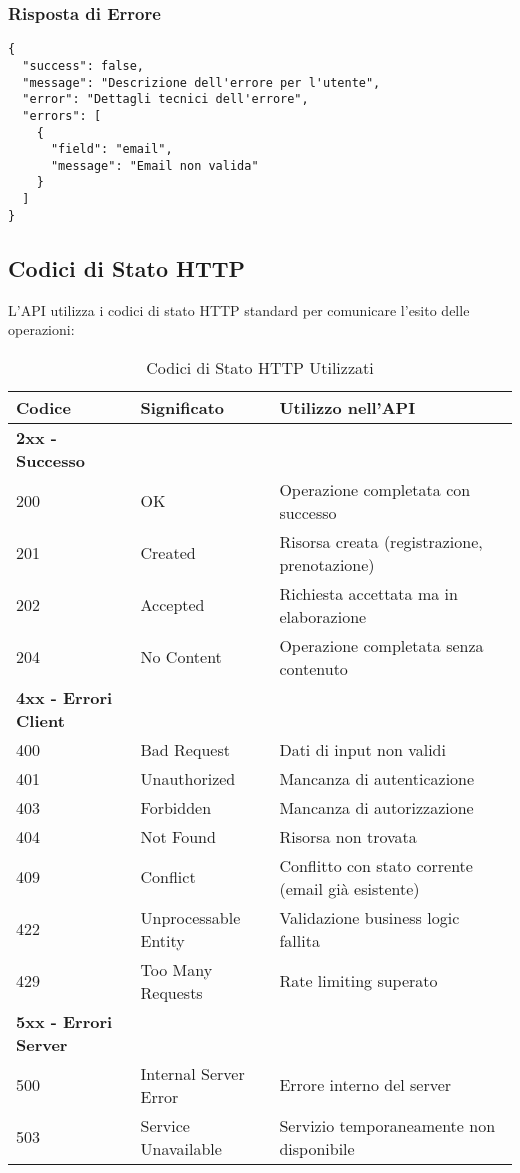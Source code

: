 \subsubsection{Risposta di Errore}
\begin{lstlisting}[caption=Struttura Risposta di Errore]
{
  "success": false,
  "message": "Descrizione dell'errore per l'utente",
  "error": "Dettagli tecnici dell'errore",
  "errors": [
    {
      "field": "email",
      "message": "Email non valida"
    }
  ]
}
\end{lstlisting}

\subsection{Codici di Stato HTTP}
L'API utilizza i codici di stato HTTP standard per comunicare l'esito delle operazioni:

\begin{table}[H]
\centering
\begin{tabular}{@{}lp{4cm}p{7cm}@{}}
\toprule
\textbf{Codice} & \textbf{Significato} & \textbf{Utilizzo nell'API} \\
\midrule
\textbf{2xx - Successo} & & \\
200 & OK & Operazione completata con successo \\
201 & Created & Risorsa creata (registrazione, prenotazione) \\
202 & Accepted & Richiesta accettata ma in elaborazione \\
204 & No Content & Operazione completata senza contenuto \\
\midrule
\textbf{4xx - Errori Client} & & \\
400 & Bad Request & Dati di input non validi \\
401 & Unauthorized & Mancanza di autenticazione \\
403 & Forbidden & Mancanza di autorizzazione \\
404 & Not Found & Risorsa non trovata \\
409 & Conflict & Conflitto con stato corrente (email già esistente) \\
422 & Unprocessable Entity & Validazione business logic fallita \\
429 & Too Many Requests & Rate limiting superato \\
\midrule
\textbf{5xx - Errori Server} & & \\
500 & Internal Server Error & Errore interno del server \\
503 & Service Unavailable & Servizio temporaneamente non disponibile \\
\bottomrule
\end{tabular}
\caption{Codici di Stato HTTP Utilizzati}
\end{table}

